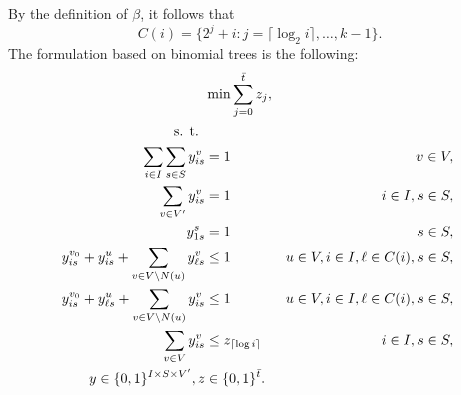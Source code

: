 By the definition of $\beta$, it follows that 
\begin{equation}
\label{eq:c1}
C(i)=\{2^j+i:j=\lceil\log_2 i\rceil,\dots,k-1\}.
\end{equation}
The formulation based on binomial trees is the following:
\begin{subequations}\label{mod:partition}
\begin{align}
\notag &\min\sum\limits_{j=0}^{\bar{t}}z_j,\\
\notag \text{s. t. } \\
\label{mod:part:nodeBelongs} \sum\limits_{i\in I}\sum\limits_{s\in S}y^v_{is} & = 1 & v\in V,\\
\label{mod:part:treeHasIJ} \sum\limits_{v\in V'}y^v_{is} & = 1 & i\in I,s\in S,\\
\label{mod:part:source1} y_{1s}^s & = 1  & s\in S,\\
\label{mod:part:followArcsA}y^{v_0}_{is}+y^u_{i s} + \sum\limits_{v\in V\setminus N(u)}y^v_{\ell s}&\leq 1 & u\in V,i\in I,\ell\in C(i), s\in S,  \\
\label{mod:part:followArcsB}y^{v_0}_{is}+y^u_{\ell s} + \sum\limits_{v\in V\setminus N(u)}y^v_{i s}&\leq 1 & u\in V,i\in I,\ell\in C(i), s\in S,\\
\label{mod:part:yzrel}\sum\limits_{v\in V}y^v_{is} & \leq z_{\lceil\log i\rceil} & i\in I,s\in S,\\
\label{mod:part:dim}y \in \{0,1\}^{I\times S\times V'}, z&\in \{0,1\}^{\bar{t}}.
\end{align}~
\end{subequations}


